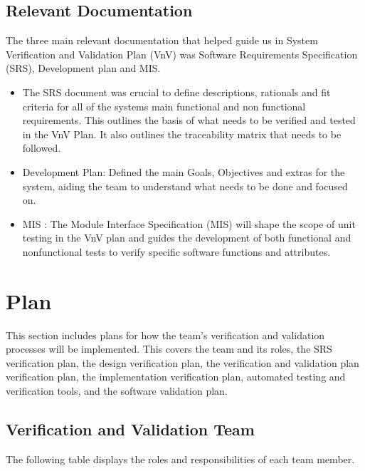 \documentclass[12pt, titlepage]{article}
\begin{document}
\subsection{Relevant Documentation}

  The three main relevant documentation that helped guide us in System Verification and Validation Plan (VnV) was Software Requirements Specification
  (SRS), Development plan and MIS.  
  
  \begin{itemize}
    \item The SRS document was crucial to define descriptions, rationals and fit criteria for all of the systems main functional 
    and non functional requirements. This outlines the basis of what needs to be verified and tested in the VnV Plan. It also outlines the 
    traceability matrix that needs to be followed.
    \item Development Plan: Defined the main Goals, Objectives and extras for the system, aiding the team to understand what
     needs to be done and focused on. 
    \item MIS : The Module Interface Specification (MIS) will shape the scope of unit testing in the VnV plan and guides 
    the development of both functional and nonfunctional tests to verify specific software functions and attributes.
  \end{itemize}


\newpage

\section{Plan}
\hspace{2em}This section includes plans for how the team's verification and validation processes will
be implemented. This covers the team and its roles, the SRS verification plan, the design
verification plan, the verification and validation plan verification plan, the implementation
verification plan, automated testing and verification tools, and the software validation plan.

\subsection{Verification and Validation Team}

\hspace{2em}The following table displays the roles and responsibilities of each team member.
\end{document}
